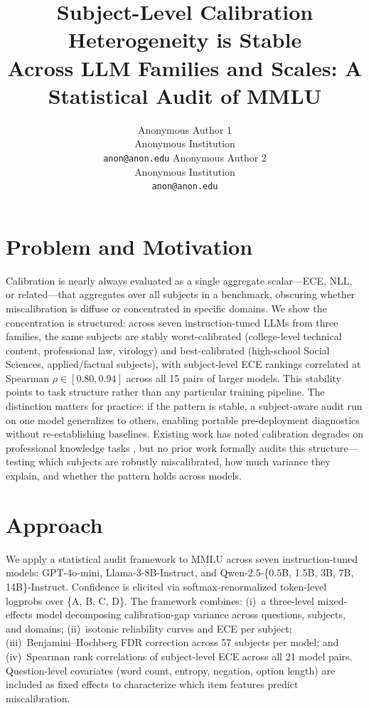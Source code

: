 \documentclass{article}
\title{Subject-Level Calibration Heterogeneity is Stable\\
  Across LLM Families and Scales: A Statistical Audit of MMLU}
\author{%
  Anonymous Author 1 \\
  Anonymous Institution \\
  \texttt{anon@anon.edu}
  \And
  Anonymous Author 2 \\
  Anonymous Institution \\
  \texttt{anon@anon.edu}
}
\begin{document}
\maketitle

\section{Problem and Motivation}

Calibration is nearly always evaluated as a single aggregate scalar---ECE, NLL,
or related---that aggregates over all subjects in a benchmark, obscuring whether
miscalibration is diffuse or concentrated in specific domains. We show the
concentration is structured: across seven instruction-tuned LLMs from three
families, the same subjects are stably worst-calibrated (college-level technical
content, professional law, virology) and best-calibrated (high-school Social
Sciences, applied/factual subjects), with subject-level ECE rankings correlated
at Spearman $\rho \in [0.80, 0.94]$ across all 15 pairs of larger models. This
stability points to task structure rather than any particular training pipeline.
The distinction matters for practice: if the pattern is stable, a subject-aware
audit run on one model generalizes to others, enabling portable pre-deployment
diagnostics without re-establishing baselines. Existing work has noted
calibration degrades on professional knowledge tasks \citep{xiong2024can},
but no prior work formally audits this structure---testing which subjects are
robustly miscalibrated, how much variance they explain, and whether the pattern
holds across models.

\section{Approach}

We apply a statistical audit framework to MMLU \citep{hendrycks2021measuring}
across seven instruction-tuned models: GPT-4o-mini, Llama-3-8B-Instruct, and
Qwen-2.5-\{0.5B, 1.5B, 3B, 7B, 14B\}-Instruct. Confidence is elicited via
softmax-renormalized token-level logprobs over \{A, B, C, D\}. The framework
combines: (i)~a three-level mixed-effects model decomposing calibration-gap
variance across questions, subjects, and domains; (ii)~isotonic reliability
curves and ECE per subject; (iii)~Benjamini--Hochberg FDR correction
\citep{bh1995} across 57 subjects per model; and (iv)~Spearman rank
correlations of subject-level ECE across all 21 model pairs. Question-level
covariates (word count, entropy, negation, option length) are included as fixed
effects to characterize which item features predict miscalibration.
\end{document}
